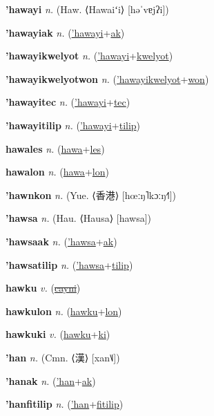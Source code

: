 \textbf{\hypertarget{'hawayi}{'hawayi}} \textit{n.} (Haw. ⟨Hawaiʻi⟩ [həˈvɐjʔi])


\textbf{\hypertarget{'hawayiak}{'hawayiak}} \textit{n.} (\hyperlink{'hawayi}{'hawayi}+\allowbreak \hyperlink{ak}{ak})


\textbf{\hypertarget{'hawayikwelyot}{'hawayikwelyot}} \textit{n.} (\hyperlink{'hawayi}{'hawayi}+\allowbreak \hyperlink{kwelyot}{kwelyot})


\textbf{\hypertarget{'hawayikwelyotwon}{'hawayikwelyotwon}} \textit{n.} (\hyperlink{'hawayikwelyot}{'hawayikwelyot}+\allowbreak \hyperlink{won}{won})


\textbf{\hypertarget{'hawayitec}{'hawayitec}} \textit{n.} (\hyperlink{'hawayi}{'hawayi}+\allowbreak \hyperlink{tec}{tec})


\textbf{\hypertarget{'hawayitilip}{'hawayitilip}} \textit{n.} (\hyperlink{'hawayi}{'hawayi}+\allowbreak \hyperlink{tilip}{tilip})


\textbf{\hypertarget{hawales}{hawales}} \textit{n.} (\hyperlink{hawa}{hawa}+\allowbreak \hyperlink{les}{les})


\textbf{\hypertarget{hawalon}{hawalon}} \textit{n.} (\hyperlink{hawa}{hawa}+\allowbreak \hyperlink{lon}{lon})


\textbf{\hypertarget{'hawnkon}{'hawnkon}} \textit{n.} (Yue. ⟨{\chinese{}香港}⟩ [hœːŋ˥kɔːŋ˧˥])


\textbf{\hypertarget{'hawsa}{'hawsa}} \textit{n.} (Hau. ⟨Hausa⟩ [hawsa])


\textbf{\hypertarget{'hawsaak}{'hawsaak}} \textit{n.} (\hyperlink{'hawsa}{'hawsa}+\allowbreak \hyperlink{ak}{ak})


\textbf{\hypertarget{'hawsatilip}{'hawsatilip}} \textit{n.} (\hyperlink{'hawsa}{'hawsa}+\allowbreak \hyperlink{tilip}{tilip})


\textbf{\hypertarget{hawku}{hawku}} \textit{v.} (\hyperlink{cayni}{\sout{cayni}})


\textbf{\hypertarget{hawkulon}{hawkulon}} \textit{n.} (\hyperlink{hawku}{hawku}+\allowbreak \hyperlink{lon}{lon})


\textbf{\hypertarget{hawkuki}{hawkuki}} \textit{v.} (\hyperlink{hawku}{hawku}+\allowbreak \hyperlink{ki}{ki})


\textbf{\hypertarget{'han}{'han}} \textit{n.} (Cmn. ⟨{\chinese{}漢}⟩ [xan˥˩])


\textbf{\hypertarget{'hanak}{'hanak}} \textit{n.} (\hyperlink{'han}{'han}+\allowbreak \hyperlink{ak}{ak})


\textbf{\hypertarget{'hanfitilip}{'hanfitilip}} \textit{n.} (\hyperlink{'han}{'han}+\allowbreak \hyperlink{fitilip}{fitilip})


